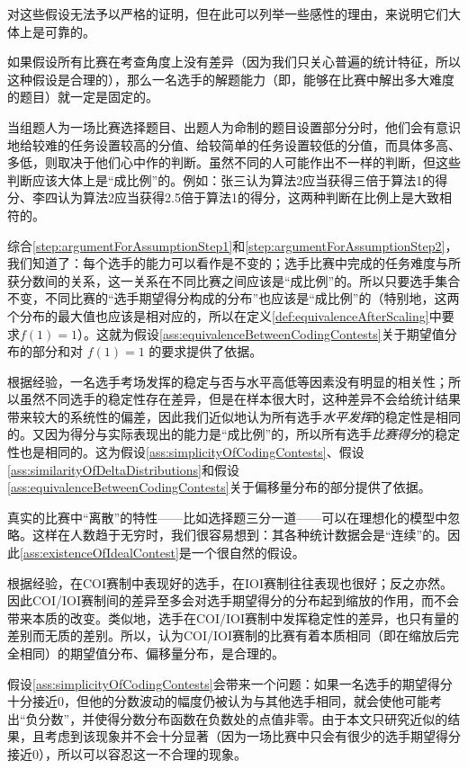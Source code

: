         对这些假设无法予以严格的证明，但在此可以列举一些感性的理由，来说明它们大体上是可靠的。

        \begin{asparaenum}
            \item \label{step:argumentForAssumptionStep1} 如果假设所有比赛在考查角度上没有差异（因为我们只关心普遍的统计特征，所以这种假设是合理的），那么一名选手的解题能力（即，能够在比赛中解出多大难度的题目）就一定是固定的。
            \item \label{step:argumentForAssumptionStep2} 当组题人为一场比赛选择题目、出题人为命制的题目设置部分分时，他们会有意识地给较难的任务设置较高的分值、给较简单的任务设置较低的分值，而具体多高、多低，则取决于他们心中作的判断。虽然不同的人可能作出不一样的判断，但这些判断应该大体上是“成比例”的。例如：张三认为算法2应当获得三倍于算法1的得分、李四认为算法2应当获得2.5倍于算法1的得分，这两种判断在比例上是大致相符的。
            \item 综合\ref{step:argumentForAssumptionStep1}和\ref{step:argumentForAssumptionStep2}，我们知道了：每个选手的能力可以看作是不变的；选手比赛中完成的任务难度与所获分数间的关系，这一关系在不同比赛之间应该是“成比例”的。所以只要选手集合不变，不同比赛的“选手期望得分构成的分布”也应该是“成比例”的（特别地，这两个分布的最大值也应该是相对应的，所以在定义\ref{def:equivalenceAfterScaling}中要求$f(1)=1$）。这就为假设\ref{ass:equivalenceBetweenCodingContests}关于期望值分布的部分和对 $f(1)=1$ 的要求提供了依据。
            \item 根据经验，一名选手考场发挥的稳定与否与水平高低等因素没有明显的相关性；所以虽然不同选手的稳定性存在差异，但是在样本很大时，这种差异不会给统计结果带来较大的系统性的偏差，因此我们近似地认为所有选手\emph{水平发挥}的稳定性是相同的。又因为得分与实际表现出的能力是“成比例”的，所以所有选手\emph{比赛得分}的稳定性也是相同的。这为假设\ref{ass:simplicityOfCodingContests}、假设\ref{ass:similarityOfDeltaDistributions}和假设\ref{ass:equivalenceBetweenCodingContests}关于偏移量分布的部分提供了依据。
            \item 真实的比赛中“离散”的特性——比如选择题三分一道——可以在理想化的模型中忽略。这样在人数趋于无穷时，我们很容易想到：其各种统计数据会是“连续”的。因此\ref{ass:existenceOfIdealContest}是一个很自然的假设。
            \item 根据经验，在COI赛制中表现好的选手，在IOI赛制往往表现也很好；反之亦然。因此COI/IOI赛制间的差异至多会对选手期望得分的分布起到缩放的作用，而不会带来本质的改变。类似地，选手在COI/IOI赛制中发挥稳定性的差异，也只有量的差别而无质的差别。所以，认为COI/IOI赛制的比赛有着本质相同（即在缩放后完全相同）的期望值分布、偏移量分布，是合理的。
            \item 假设\ref{ass:simplicityOfCodingContests}会带来一个问题：如果一名选手的期望得分十分接近0，但他的分数波动的幅度仍被认为与其他选手相同，就会使他可能考出“负分数”，并使得分数分布函数在负数处的点值非零。由于本文只研究近似的结果，且考虑到该现象并不会十分显著（因为一场比赛中只会有很少的选手期望得分接近0），所以可以容忍这一不合理的现象。
        \end{asparaenum}

